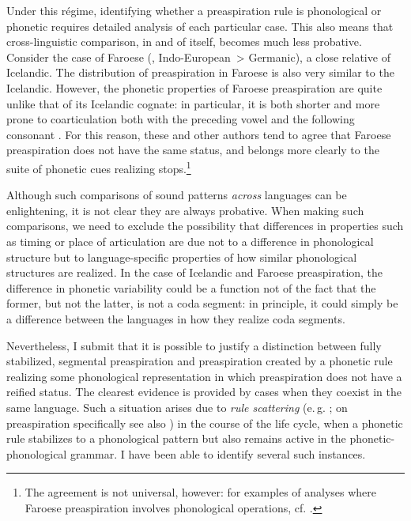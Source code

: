 \documentclass[output=paper,colorlinks,citecolor=brown]{langscibook}
\begin{document}
Under this régime, identifying whether a preaspiration rule is phonological or phonetic requires detailed analysis of each particular case. This also means that cross\hyp linguistic comparison, in and of itself, becomes much less probative. Consider the case of Faroese (, Indo\hyp European~> Germanic), a close relative of Icelandic. The distribution of preaspiration in Faroese is also very similar to the Icelandic. However, the phonetic properties of Faroese preaspiration are quite unlike that of its Icelandic cognate: in particular, it is both shorter and more prone to coarticulation both with the preceding vowel and the following consonant \parencite{helgason, árnason2011icelandic}. For this reason, these and other authors tend to agree that Faroese preaspiration does not have the same status, and belongs more clearly to the suite of phonetic cues realizing {\VOICELESS} stops.\footnote{The agreement is not universal, however: for examples of analyses where Faroese preaspiration involves phonological operations, cf. \textcite{hansson2003laryngeal, voeltzel2022faroese, craioveanu2023phd}.}

Although such comparisons of sound patterns \emph{across} languages can be enlightening, it is not clear they are always probative. When making such comparisons, we need to exclude the possibility that differences in properties such as timing or place of articulation are due not to a difference in phonological structure but to language\hyp specific properties of how similar phonological structures are realized. In the case of Icelandic and Faroese preaspiration, the difference in phonetic variability could be a function not of the fact that the former, but not the latter, is not a coda segment: in principle, it could simply be a difference between the languages in how they realize coda segments.

Nevertheless, I submit that it is possible to justify a distinction between fully stabilized, segmental preaspiration and preaspiration created by a phonetic rule realizing some phonological representation in which preaspiration does not have a reified status.
The clearest evidence is provided by cases when they coexist in the same language. Such a situation arises due to \emph{rule scattering} (e.\,g. \citealt{cohn98, bermúdez-otero2015amphichronic}; on preaspiration specifically see also \citealt{hejná2019pre}) in the course of the life cycle, when a phonetic rule stabilizes to a phonological pattern but also remains active in the phonetic\hyp phonological grammar. I have been able to identify several such instances.
\end{document}
